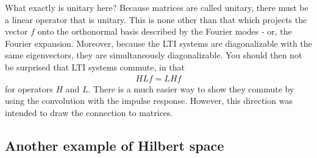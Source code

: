 \documentclass[11pt]{article}
\theoremstyle{plain}
\theoremstyle{definition}
\theoremstyle{remark}
\begin{document}
What exactly is unitary here? Because matrices are called unitary, there must be a linear operator that is unitary. This is none other than that which projects the vector $f$ onto the orthonormal basis described by the Fourier modes - or, the Fourier expansion. Moreover, because the LTI systems are diagonalizable with the same eigenvectors, they are simultaneously diagonalizable. You should then not be surprised that LTI systems commute, in that
\begin{align*}
    HLf = LHf
\end{align*}
for operators $H$ and $L$. There is a much easier way to show they commute by using the convolution with the impulse response. However, this direction was intended to draw the connection to matrices.

\subsection*{Another example of Hilbert space}
\end{document}
